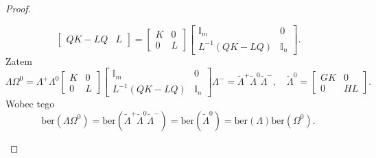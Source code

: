 \documentclass[11pt,a4paper]{report}
\theoremstyle{definition}
\newcommand{\ber}{\mathrm{ber}}
\newcommand{\I}{\mathbb{I}}
\begin{document}
\begin{proof}
\begin{enumerate}[1)]
$$\begin{bmatrix}
     QK - LQ & L 
     \end{bmatrix} = \begin{bmatrix}
     K & 0 \\
     0 & L 
     \end{bmatrix} \begin{bmatrix}
     \I_m & 0 \\
     L^{-1}(QK - LQ) & \I_n 
     \end{bmatrix}\!\!.$$
Zatem 
\begin{equation*}
 \Lambda \Omega^0 = \Lambda^+ \Lambda^0 \begin{bmatrix}
     K & 0 \\
     0 & L 
     \end{bmatrix} \begin{bmatrix}
     \I_m & 0 \\
     L^{-1}(QK - LQ) & \I_n 
     \end{bmatrix} \Lambda^- = \tilde{\Lambda}^+ \tilde{\Lambda}^0 \tilde{\Lambda}^-, \quad \tilde{\Lambda}^0 = \begin{bmatrix}
     GK & 0 \\
     0 & HL 
     \end{bmatrix}\!.
\end{equation*}
Wobec tego
\begin{equation*}
 \ber(\Lambda \Omega^0) = \ber \left( \tilde\Lambda^+ \tilde\Lambda^0 \tilde\Lambda^- \right) =  \ber(\tilde\Lambda^0) = \ber(\Lambda) \ber( \Omega^0).
\end{equation*}


\end{enumerate}
\end{proof}
\end{document}
